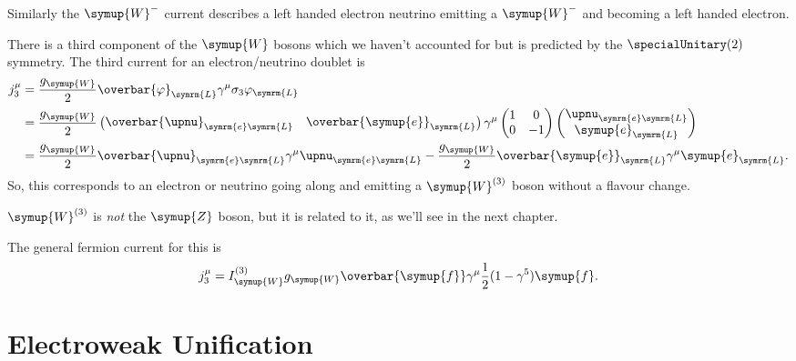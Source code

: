\documentclass[fleqn]{NotesClass}
\newcommand{\Pparticle}[1]{\symup{#1}}
\newcommand{\Penominus}{\ensuremath{\Pparticle{e}}}
\newcommand{\PZ}{\ensuremath{\Pparticle{Z}}}
\newcommand{\PW}{\ensuremath{\Pparticle{W}}}
\newcommand{\PWm}{\ensuremath{\Pparticle{W}^{-}}}
\newcommand{\Pf}{\ensuremath{\Pparticle{f}}}
\newcommand{\diracadjoint}[1]{\overbar{#1}}
\newcommand{\Left}{\symrm{L}}
\begin{document}
    Similarly the \(\PWm\) current describes a left handed electron neutrino emitting a \(\PWm\) and becoming a left handed electron.
    
    There is a third component of the \(\PW\) bosons which we haven't accounted for but is predicted by the \(\specialUnitary(2)\) symmetry.
    The third current for an electron/neutrino doublet is
    \begin{align}
        j_3^\mu &= \frac{g_{\PW}}{2} \diracadjoint{\varphi}_{\Left}\gamma^\mu \sigma_3\varphi_{\Left}\\
        &= \frac{g_{\PW}}{2} 
        \begin{pmatrix}
            \diracadjoint{\upnu}_{\symrm{e}\Left} & \diracadjoint{\Penominus}_{\Left}
        \end{pmatrix}
        \gamma^\mu
        \begin{pmatrix}
            1 & 0\\
            0 & -1
        \end{pmatrix}
        \begin{pmatrix}
            \upnu_{\symrm{e}\Left}\\
            \Penominus_{\Left}
        \end{pmatrix}
        \\
        &= \frac{g_{\PW}}{2} \diracadjoint{\upnu}_{\symrm{e}\Left} \gamma^\mu \upnu_{\symrm{e}\Left} - \frac{g_{\PW}}{2} \diracadjoint{\Penominus}_{\Left} \gamma^\mu \Penominus_{\Left}.
    \end{align}
    So, this corresponds to an electron or neutrino going along and emitting a \(\PW^{(3)}\) boson without a flavour change.
    \begin{wrn}
        \(\PW^{(3)}\) is \emph{not} the \(\PZ\) boson, but it is related to it, as we'll see in the next chapter.
    \end{wrn}
    The general fermion current for this is
    \begin{equation}
        j_3^\mu = I_{\PW}^{(3)} g_{\PW} \diracadjoint{\Pf} \gamma^\mu \frac{1}{2}(1 - \gamma^5)\Pf.
    \end{equation}

    \chapter{Electroweak Unification}
\end{document}
